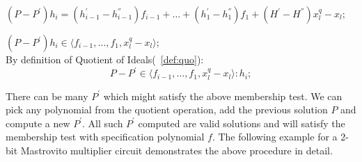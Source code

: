 $(P-P^{'})h_i = (h_{i-1}^{'}-h_{i-1}^{''})f_{i-1}+\dots+(h_{1}^{'}-h_{1}^{''})f_{1}+(H^{'}-H^{''})x_l^q-x_l;$

$(P-P^{'})h_i \in \langle f_{i-1},\dots,f_1,x_l^q-x_l\rangle;$\\
By definition of Quotient of Ideals(~\ref{def:quo}):
\vspace{0.1in}
\begin{equation}
\label{quotcomp}
P-P^{'} \in \langle f_{i-1},\dots,f_1,x_l^q-x_l\rangle:h_i;
\end{equation}

There can be many $P^{'}$ which might satisfy the above membership test. We can pick any polynomial from the quotient operation, add the previous solution $P$ and compute a new $P^{'}$. All such $P^{'}$ computed are valid solutions and will satisfy the membership test with specification polynomial $f$. The following example for a 2-bit Mastrovito multiplier circuit demonstrates the above procedure in detail.

